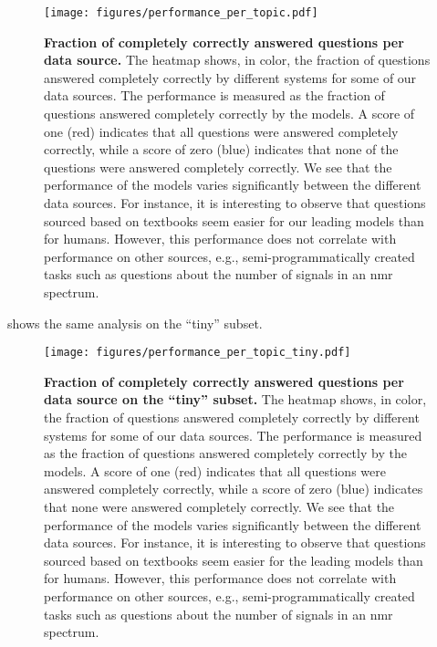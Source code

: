 \begin{figure}[htb]
    \centering
    \texttt{[image: figures/performance\_per\_topic.pdf]}
    \caption{\textbf{Fraction of completely correctly answered questions per data source.} The heatmap shows, in color, the fraction of questions answered completely correctly by different systems for some of our data sources. The performance is measured as the fraction of questions answered completely correctly by the models. A score of one (red) indicates that all questions were answered completely correctly, while a score of zero (blue) indicates that none of the questions were answered completely correctly.
        We see that the performance of the models varies significantly between the different data sources. For instance, it is interesting to observe that questions sourced based on textbooks seem easier for our leading models than for humans. However, this performance does not correlate with performance on other sources, e.g., semi-programmatically created tasks such as questions about the number of signals in an \gls{nmr} spectrum.
    }
    \label{fig:performance_per_topic}
\end{figure}

 shows the same analysis on the \enquote{tiny} subset. 


\begin{figure}[htb]
    \centering
    \texttt{[image: figures/performance\_per\_topic\_tiny.pdf]}
    \caption{\textbf{Fraction of completely correctly answered questions per data source on the \enquote{tiny} subset.} The heatmap shows, in color, the fraction of questions answered completely correctly by different systems for some of our data sources. The performance is measured as the fraction of questions answered completely correctly by the models. A score of one (red) indicates that all questions were answered completely correctly, while a score of zero (blue) indicates that none were answered completely correctly.
        We see that the performance of the models varies significantly between the different data sources. For instance, it is interesting to observe that questions sourced based on textbooks seem easier for the leading models than for humans. However, this performance does not correlate with performance on other sources, e.g., semi-programmatically created tasks such as questions about the number of signals in an \gls{nmr} spectrum.
    }
    \label{fig:performance_per_topic_tiny}
\end{figure}

